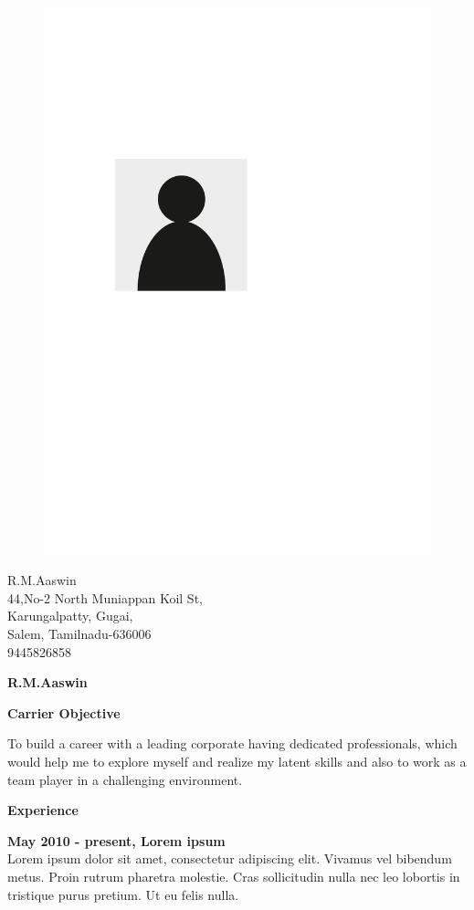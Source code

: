 \documentclass[a4paper,12pt,final]{memoir}
\newcommand{\SmallSep}{\vspace{0.5em}}
\newcommand{\CVSection}[1]
	{\Large\textbf{#1}\par
	\SmallSep\normalsize\normalfont}
\newcommand{\CVItem}[1]
	{\textbf{\color{RoyalBlue} #1}}
\begin{document}
\begin{figure}
	\hfill
	\includegraphics[width=0.6\columnwidth]{photo}
	\vspace{-7cm}
\end{figure}

\begin{flushright}\small
	R.M.Aaswin \\
	44,No-2 North Muniappan Koil St,\\
	Karungalpatty, Gugai, \\
	Salem, Tamilnadu-636006\\
	9445826858

\end{flushright}\normalsize
\framebreak


\Huge\bfseries {\color{RoyalBlue} R.M.Aaswin} \\


\normalsize\normalfont

\CVSection{Carrier Objective}
To build a career with a leading corporate having dedicated professionals, which would help me to explore myself and realize my latent skills and also to work as a team player in a challenging environment.
\SmallSep

\CVSection{Experience}
\CVItem{May 2010 - present, Lorem ipsum}\\
Lorem ipsum dolor sit amet, consectetur adipiscing elit. Vivamus vel bibendum metus. Proin rutrum pharetra molestie. Cras sollicitudin nulla nec leo lobortis in tristique purus pretium. Ut eu felis nulla.
\SmallSep
\end{document}
